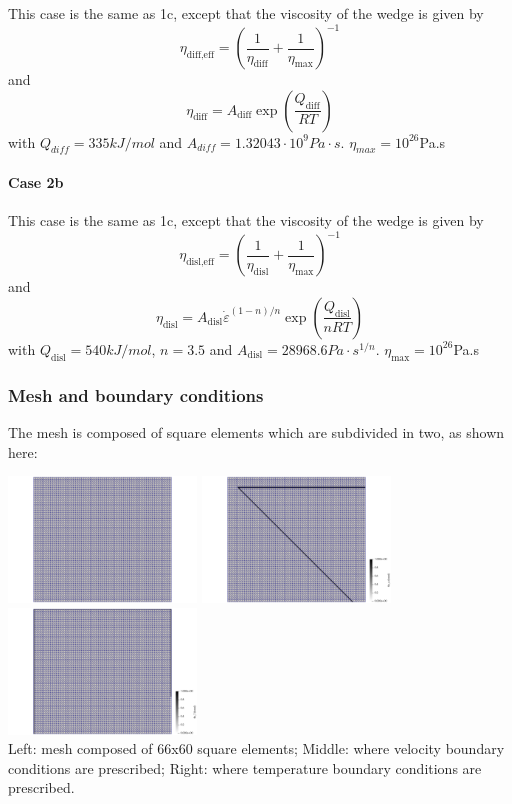 This case is the same as 1c, except that the viscosity of the wedge
is given by 
\[
\eta_{\text{diff,eff}} = \left( \frac{1}{\eta_{\text{diff}}} + \frac{1}{\eta_{\text{max}}} \right)^{-1}
\]
and
\[
\eta_{\text{diff}}=A_{\text{diff}} \exp\left( \frac{Q_{\text{diff}}}{RT} \right)
\]
with
$Q_{diff}=335kJ/mol$ and $A_{diff}=1.32043 \cdot 10^9Pa\cdot s$. $\eta_{max}=10^{26}$Pa.s

\paragraph{Case 2b}

This case is the same as 1c, except that the viscosity of the wedge
is given by 
\[
\eta_{\text{disl,eff}} = \left( \frac{1}{\eta_{\text{disl}}} + \frac{1}{\eta_{\text{max}}} \right)^{-1}
\]
and
\[
\eta_{\text{disl}}=
A_{\text{disl}} \dot\varepsilon^{(1-n)/n} \exp \left( \frac{Q_{\text{disl}}}{nRT} \right)
\]
with $Q_{\text{disl}}=540kJ/mol$, $n=3.5$ and $A_{\text{disl}}=28968.6Pa\cdot s^{1/n}$. 
$\eta_{\text{max}}=10^{26}$Pa.s


\subsubsection*{Mesh and boundary conditions}

The mesh is composed of square elements which are subdivided in two, as shown here:

\begin{center}
\includegraphics[width=5cm]{python_codes/fieldstone_68/results/case1a/mesh}
\includegraphics[width=5cm]{python_codes/fieldstone_68/results/case1a/fix_uv}
\includegraphics[width=5cm]{python_codes/fieldstone_68/results/case1a/fix_T}\\
{\captionfont Left: mesh composed of 66x60 square elements; 
Middle: where velocity boundary conditions are prescribed;
Right: where temperature boundary conditions are prescribed.}
\end{center}

